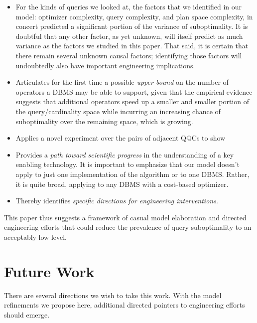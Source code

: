 \documentclass[prodmode,acmtods]{acmsmall}
\begin{document}
\begin{itemize}
\item For the kinds of queries we looked at, the factors that we
identified in our model: optimizer complexity, query complexity, and plan
space complexity, in concert predicted a significant portion of the variance
of suboptimality.  It is doubtful that any other factor, as yet unknown,
will itself predict as much variance as the factors we studied in this
paper. That said, it is certain that there remain several unknown causal factors;
identifying those factors will undoubtedly also have important engineering
implications.

\item Articulates for the first time a possible {\em upper bound} on the
  number of operators a \hbox{DBMS} may be able to support, given that the
  empirical evidence suggests that additional operators speed up a smaller
  and smaller portion of the query/cardinality space while incurring an
  increasing chance of suboptimality over the remaining space, which is
  growing.

\item Applies a novel experiment over the pairs of adjacent Q@Cs to show

\item Provides a {\em path toward scientific progress} in the
  understanding of a key enabling technology. 
  It is important to emphasize that our model doesn't apply to just one implementation of the
algorithm or to one \hbox{DBMS}.  Rather, it is quite broad, applying to any \hbox{DBMS}
with a cost-based optimizer.

\item Thereby identifies {\em specific directions for engineering interventions}.

\end{itemize}
This paper thus suggests a framework of casual model elaboration and
directed engineering efforts that could reduce the prevalence of query suboptimality to an acceptably
low level.

\section{Future Work}\label{sec:future}
There are several directions we wish to take this work. With the model refinements
we propose here, additional directed pointers to engineering efforts should
emerge.

\end{document}

